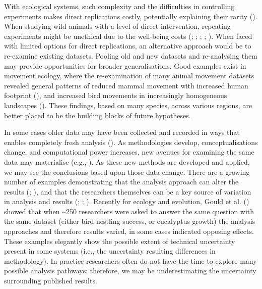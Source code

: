 \documentclass[10pt,a4paper]{article}
\begin{document}
With ecological systems, such complexity and the difficulties in controlling experiments makes direct replications costly, potentially explaining their rarity ().
When studying wild animals with a level of direct intervention, repeating experiments might be unethical due to the well-being costs (; ; ; ; ).
When faced with limited options for direct replications, an alternative approach would be to re-examine existing datasets.
Pooling old and new datasets and re-analysing them may provide opportunities for broader generalisations.
Good examples exist in movement ecology, where the re-examination of many animal movement datasets revealed general patterns of reduced mammal movement with increased human footprint (), and increased bird movements in increasingly homogeneous landscapes ().
These findings, based on many species, across various regions, are better placed to be the building blocks of future hypotheses.

In some cases older data may have been collected and recorded in ways that enables completely fresh analysis ().
As methodologies develop, conceptualisations change, and computational power increases, new avenues for examining the same data may materialise (e.g., ).
As these new methods are developed and applied, we may see the conclusions based upon those data change.
There are a growing number of examples demonstrating that the analysis approach can alter the results (; ), and that the researchers themselves can be a key source of variation in analysis and results (; ; ).
Recently for ecology and evolution, Gould et al. () showed that when \textasciitilde250 researchers were asked to answer the same question with the same dataset (either bird nestling success, or eucalyptus growth) the analysis approaches and therefore results varied, in some cases indicated opposing effects.
These examples elegantly show the possible extent of technical uncertainty present in some systems (i.e., the uncertainty resulting differences in methodology).
In practice researchers often do not have the time to explore many possible analysis pathways; therefore, we may be underestimating the uncertainty surrounding published results.
\end{document}

